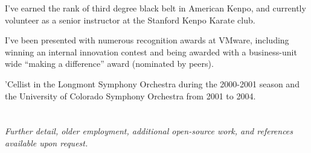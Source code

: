 \documentclass[margin,line]{resume}
\begin{document}
\begin{resume}
    \begin{list1}
    \item I've earned the rank of third degree black belt in American Kenpo, and
          currently volunteer as a senior instructor at the Stanford Kenpo
          Karate club.
    \item I've been presented with numerous recognition awards at VMware,
          including winning an internal innovation contest and being awarded
	  with a business-unit wide ``making a difference'' award (nominated by
	  peers).
    \ifcv
        \item 'Cellist in the Longmont Symphony Orchestra during the 2000-2001
              season and the University of Colorado Symphony Orchestra from 2001
              to 2004.
    \fi
    \end{list1}


    \ifcv
    \else
        \section{}
        {\sl Further detail, older employment, additional open-source work, and references
	     available upon request.}
    \fi


\end{resume}
\end{document}
